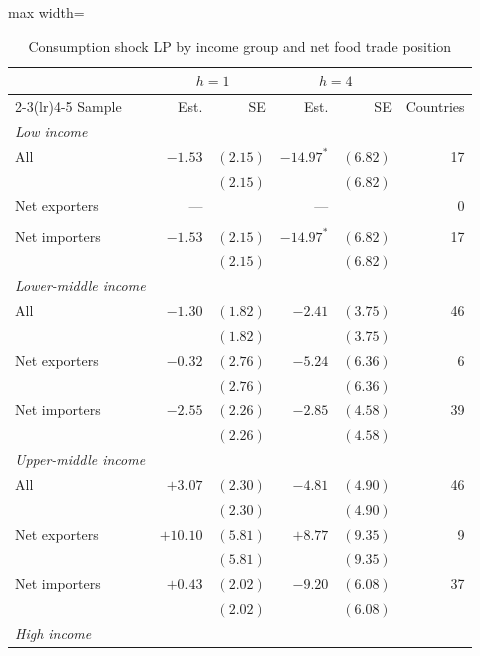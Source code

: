 
\begin{table}[htbp]
\centering
\caption{Consumption shock LP by income group and net food trade position}
\label{tab:nettrade-split}
\begin{adjustbox}{max width=\textwidth}
\begin{threeparttable}\small
\begin{tabular}{l rr rr r}
\toprule
 & \multicolumn{2}{c}{$h = 1$} & \multicolumn{2}{c}{$h = 4$} & \\
\cmidrule(lr){2-3}\cmidrule(lr){4-5}
Sample & Est. & SE & Est. & SE & Countries \\
\midrule
\textit{Low income} \\
\quad All & $-1.53$ & $(2.15)$ & $-14.97^{*}$ & $(6.82)$ & 17 \\
 & & $(2.15)$ & & $(6.82)$ & \\
\quad Net exporters & --- &  & --- &  & 0 \\
 & &  & &  & \\
\quad Net importers & $-1.53$ & $(2.15)$ & $-14.97^{*}$ & $(6.82)$ & 17 \\
 & & $(2.15)$ & & $(6.82)$ & \\
\addlinespace
\textit{Lower-middle income} \\
\quad All & $-1.30$ & $(1.82)$ & $-2.41$ & $(3.75)$ & 46 \\
 & & $(1.82)$ & & $(3.75)$ & \\
\quad Net exporters & $-0.32$ & $(2.76)$ & $-5.24$ & $(6.36)$ & 6 \\
 & & $(2.76)$ & & $(6.36)$ & \\
\quad Net importers & $-2.55$ & $(2.26)$ & $-2.85$ & $(4.58)$ & 39 \\
 & & $(2.26)$ & & $(4.58)$ & \\
\addlinespace
\textit{Upper-middle income} \\
\quad All & $+3.07$ & $(2.30)$ & $-4.81$ & $(4.90)$ & 46 \\
 & & $(2.30)$ & & $(4.90)$ & \\
\quad Net exporters & $+10.10$ & $(5.81)$ & $+8.77$ & $(9.35)$ & 9 \\
 & & $(5.81)$ & & $(9.35)$ & \\
\quad Net importers & $+0.43$ & $(2.02)$ & $-9.20$ & $(6.08)$ & 37 \\
 & & $(2.02)$ & & $(6.08)$ & \\
\addlinespace
\textit{High income} \\

\end{tabular}
\end{threeparttable}
\end{adjustbox}
\end{table}
